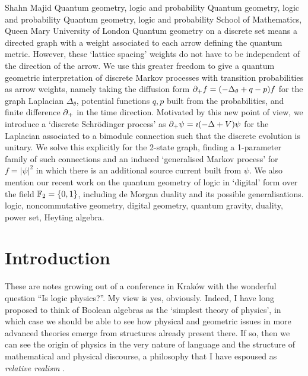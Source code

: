 \begin{artengenv}{Shahn Majid}
	{Quantum geometry, logic and probability}
	{Quantum geometry, logic and probability}
	{Quantum geometry, logic and probability}
	{School of Mathematics, Queen Mary University of London}
	{Quantum geometry on a discrete set means a directed graph with a weight associated to each arrow defining the quantum metric. However, these `lattice spacing' weights do not have to be independent of the direction of the arrow. We use this greater freedom to give a quantum geometric interpretation of discrete Markov processes with transition probabilities as arrow weights, namely taking the diffusion form ${\partial}_+ f=(-\Delta_\theta+ q-p)f$ for the graph Laplacian $\Delta_\theta$, potential functions $q,p$ built from the probabilities, and finite difference ${\partial}_+$ in the time direction. Motivated by this new point of view, we introduce a `discrete Schr\"odinger process' as ${\partial}_+\psi=\imath(-\Delta+V)\psi$ for the Laplacian associated to a bimodule connection such that the discrete evolution is unitary. We solve this explicitly for the 2-state graph, finding a 1-parameter family of such connections and an induced `generalised Markov process' for $f=|\psi|^2$ in which there is an additional source current built from $\psi$. We also mention our recent work on the quantum geometry of logic in `digital' form over the field ${\mathbb{F}}_2=\{0,1\}$, including de Morgan duality and its possible generalisations. }
	{logic, noncommutative geometry, digital geometry, quantum gravity, duality, power set, Heyting algebra.}




\section{Introduction}

\lettrine[loversize=0.13,lines=2,lraise=-0.03,nindent=0em,findent=0.2pt]%
{T}{}hese are notes growing out of a conference in Kraków with the wonderful question ``Is logic physics?''. My view is yes, obviously. Indeed, I have long proposed \parencite{Ma:pri} to think of Boolean algebras as the `simplest theory of physics', in which case we should be able to see how physical and geometric issues in more advanced theories emerge from structures already present there. If so, then we can see the origin of physics in the very nature of language and the structure of mathematical and physical discourse, a philosophy that I have espoused as {\em relative realism} \parencite{Ma:ess,Ma:pri,Ma:qg3,Ma:sel}. 


\end{artengenv}

